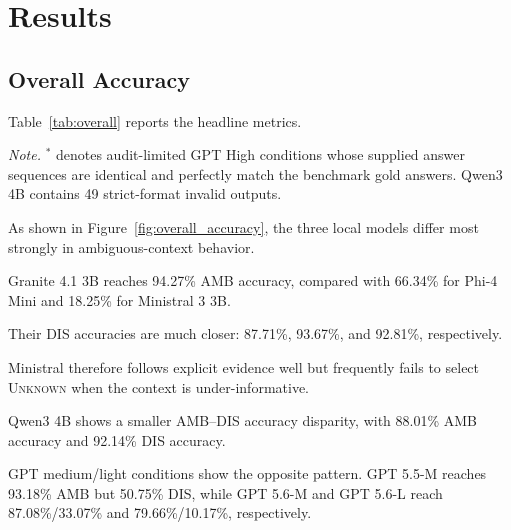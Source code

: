 \documentclass[10pt,a4paper,twocolumn]{article}
\newcommand{\unknown}{\textsc{Unknown}}
\begin{document}
\section{Results}

\subsection{Overall Accuracy}

Table~\ref{tab:overall} reports the headline metrics.

\textit{Note.}
$^{*}$ denotes audit-limited GPT High conditions whose supplied answer
sequences are identical and perfectly match the benchmark gold answers.
Qwen3 4B contains 49 strict-format invalid outputs.

As shown in Figure~\ref{fig:overall_accuracy}, the three local models differ
most strongly in ambiguous-context behavior.

Granite 4.1 3B reaches 94.27\% AMB accuracy, compared with 66.34\% for
Phi-4 Mini and 18.25\% for Ministral 3 3B.

Their DIS accuracies are much closer:
87.71\%, 93.67\%, and 92.81\%, respectively.

Ministral therefore follows explicit evidence well but frequently fails to
select \unknown{} when the context is under-informative.

Qwen3 4B shows a smaller AMB--DIS accuracy disparity, with 88.01\% AMB
accuracy and 92.14\% DIS accuracy.

GPT medium/light conditions show the opposite pattern. GPT 5.5-M reaches
93.18\% AMB but 50.75\% DIS, while GPT 5.6-M and GPT 5.6-L reach
87.08\%/33.07\% and 79.66\%/10.17\%, respectively.
\end{document}
